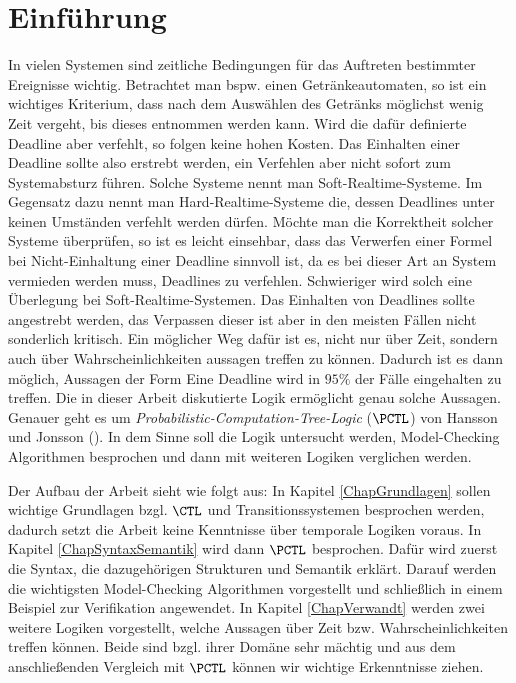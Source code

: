 \section{Einführung}

In vielen Systemen sind zeitliche Bedingungen für das Auftreten bestimmter Ereignisse wichtig.
Betrachtet man bspw. einen Getränkeautomaten, so ist ein wichtiges Kriterium, dass nach dem Auswählen des Getränks möglichst wenig Zeit vergeht, bis dieses entnommen werden kann.
Wird die dafür definierte Deadline aber verfehlt, so folgen keine hohen Kosten.
Das Einhalten einer Deadline sollte also erstrebt werden, ein Verfehlen aber nicht sofort zum Systemabsturz führen.
Solche Systeme nennt man Soft-Realtime-Systeme.
Im Gegensatz dazu nennt man Hard-Realtime-Systeme die, dessen Deadlines unter keinen Umständen verfehlt werden dürfen.
Möchte man die Korrektheit solcher Systeme überprüfen, so ist es leicht einsehbar, dass das Verwerfen einer Formel bei Nicht-Einhaltung einer Deadline sinnvoll ist, da es bei dieser Art an System vermieden werden muss, Deadlines zu verfehlen.
Schwieriger wird solch eine Überlegung bei Soft-Realtime-Systemen.
Das Einhalten von Deadlines sollte angestrebt werden, das Verpassen dieser ist aber in den meisten Fällen nicht sonderlich kritisch.
Ein möglicher Weg dafür ist es, nicht nur über Zeit, sondern auch über Wahrscheinlichkeiten aussagen treffen zu können.
Dadurch ist es dann möglich, Aussagen der Form \glqq{}Eine Deadline wird in $95\%$ der Fälle eingehalten\grqq{} zu treffen.
Die in dieser Arbeit diskutierte Logik ermöglicht genau solche Aussagen.
Genauer geht es um \textit{Probabilistic-Computation-Tree-Logic} ($\PCTL$) von Hansson und Jonsson (\cite{hansson1994logic}).
In dem Sinne soll die Logik untersucht werden, Model-Checking Algorithmen besprochen und dann mit weiteren Logiken verglichen werden.

Der Aufbau der Arbeit sieht wie folgt aus: 
In Kapitel \ref{ChapGrundlagen} sollen wichtige Grundlagen bzgl. $\CTL$ und Transitionssystemen besprochen werden, dadurch setzt die Arbeit keine Kenntnisse über temporale Logiken voraus.
In Kapitel \ref{ChapSyntaxSemantik} wird dann $\PCTL$ besprochen.
Dafür wird zuerst die Syntax, die dazugehörigen Strukturen und Semantik erklärt.
Darauf werden die wichtigsten Model-Checking Algorithmen vorgestellt und schließlich in einem Beispiel zur Verifikation angewendet.
In Kapitel \ref{ChapVerwandt} werden zwei weitere Logiken vorgestellt, welche Aussagen über Zeit bzw. Wahrscheinlichkeiten treffen können.
Beide sind bzgl. ihrer Domäne sehr mächtig und aus dem anschließenden Vergleich mit $\PCTL$ können wir wichtige Erkenntnisse ziehen.

